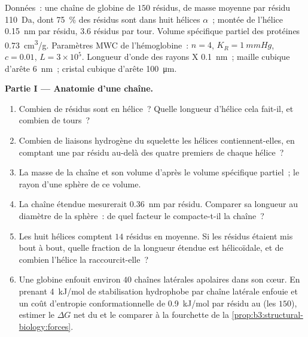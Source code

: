 \begin{problem}
\label{pb:b3:structural-biology:1}
Données~: une chaîne de globine de $150$ résidus, de masse moyenne par
résidu \qty{110}{Da}, dont \qty{75}{\%} des résidus sont dans huit
hélices $\alpha$~; montée de l'hélice \qty{0.15}{nm} par résidu, $3.6$
résidus par tour. Volume spécifique partiel des protéines
\qty{0.73}{cm^3/g}. Paramètres MWC de l'hémoglobine~: $n = 4$,
$K_{R} = \qty{1}{mmHg}$, $c = 0.01$, $L = 3\times 10^{5}$. Longueur
d'onde des rayons X \qty{0.1}{nm}~; maille cubique d'arête
\qty{6}{nm}~; cristal cubique d'arête \qty{100}{\micro m}.

\medskip
\noindent\textbf{Partie I --- Anatomie d'une chaîne.}
\begin{enumerate}
  \item Combien de résidus sont en hélice~? Quelle longueur d'hélice
        cela fait-il, et combien de tours~?
  \item Combien de liaisons hydrogène du squelette les hélices
        contiennent-elles, en comptant une par résidu au-delà des
        quatre premiers de chaque hélice~?
  \item La masse de la chaîne et son volume d'après le volume
        spécifique partiel~; le rayon d'une sphère de ce volume.
  \item La chaîne étendue mesurerait \qty{0.36}{nm} par résidu.
        Comparer sa longueur au diamètre de la sphère~: de quel facteur
        le  compacte-t-il la chaîne~?
  \item Les huit hélices comptent $14$ résidus en moyenne. Si les
        résidus étaient mis bout à bout, quelle fraction de la longueur
        étendue est hélicoïdale, et de combien l'hélice la
        raccourcit-elle~?
  \item Une globine enfouit environ $40$ chaînes latérales apolaires
        dans son cœur. En prenant \qty{4}{kJ/mol} de stabilisation
        hydrophobe par chaîne latérale enfouie et un coût d'entropie
        conformationnelle de \qty{0.9}{kJ/mol} par résidu au 
        (les $150$), estimer le $\Delta G$ net du  et le
        comparer à la fourchette de la
        \cref{prop:b3:structural-biology:forces}.
\end{enumerate}


\end{problem}
